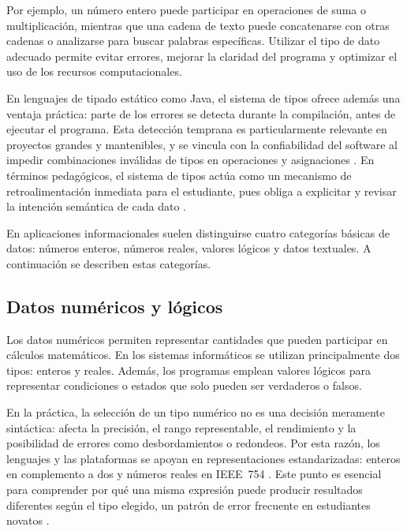 \documentclass[12pt,twoside]{book}
\begin{document}
				\noindent
				Por ejemplo, un número entero puede participar en operaciones de suma o multiplicación, mientras que una cadena de texto puede concatenarse con otras cadenas o analizarse para buscar palabras específicas. Utilizar el tipo de dato adecuado permite evitar errores, mejorar la claridad del programa y optimizar el uso de los recursos computacionales.
				
				En lenguajes de tipado estático como Java, el sistema de tipos ofrece además una ventaja práctica: parte de los errores se detecta durante la compilación, antes de ejecutar el programa. Esta detección temprana es particularmente relevante en proyectos grandes y mantenibles, y se vincula con la confiabilidad del software al impedir combinaciones inválidas de tipos en operaciones y asignaciones \cite{Pierce2002Types}. En términos pedagógicos, el sistema de tipos actúa como un mecanismo de retroalimentación inmediata para el estudiante, pues obliga a explicitar y revisar la intención semántica de cada dato \cite{Qian2018Students}.
				
				En aplicaciones informacionales suelen distinguirse cuatro categorías básicas de datos: números enteros, números reales, valores lógicos y datos textuales. A continuación se describen estas categorías.

				\subsection{Datos numéricos y lógicos}
					\noindent
					Los datos numéricos permiten representar cantidades que pueden participar en cálculos matemáticos. En los sistemas informáticos se utilizan principalmente dos tipos: enteros y reales. Además, los programas emplean valores lógicos para representar condiciones o estados que solo pueden ser verdaderos o falsos.
					
					En la práctica, la selección de un tipo numérico no es una decisión meramente sintáctica: afecta la precisión, el rango representable, el rendimiento y la posibilidad de errores como desbordamientos o redondeos. Por esta razón, los lenguajes y las plataformas se apoyan en representaciones estandarizadas: enteros en complemento a dos y números reales en IEEE~754 \cite{IEEE2019Standard754}. Este punto es esencial para comprender por qué una misma expresión puede producir resultados diferentes según el tipo elegido, un patrón de error frecuente en estudiantes novatos \cite{Qian2018Students}.
\end{document}
